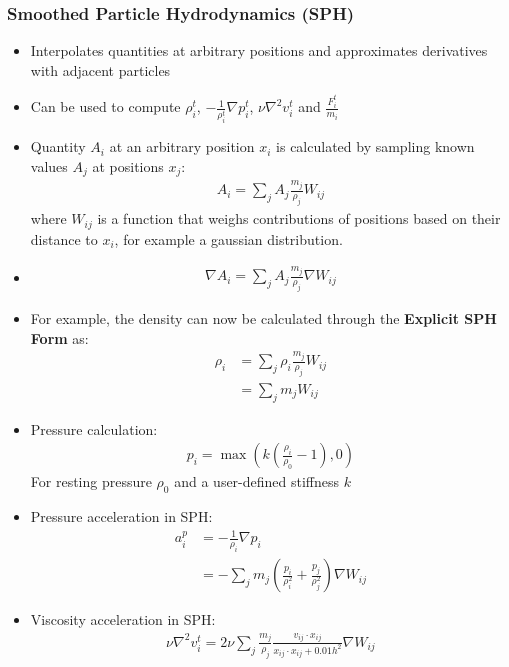 \documentclass{scrartcl}
\begin{document}
\subsubsection*{Smoothed Particle Hydrodynamics (SPH)}
\begin{itemize}
    \item Interpolates quantities at arbitrary positions and approximates derivatives with adjacent particles
    \item Can be used to compute $\rho_i^t$, $-\frac{1}{\rho_i^t}\nabla p_i^t$, $\nu\nabla^2 v_i^t$ and $\frac{F_i^t}{m_i}$
    \item Quantity $A_i$ at an arbitrary position $x_i$ is calculated by sampling known values $A_j$ at positions $x_j$:
    \begin{align*}
        A_i = \sum_j A_j \frac{m_j}{\rho_j}W_{ij}
    \end{align*}
    where $W_{ij}$ is a function that weighs contributions of positions based on their distance to $x_i$, for example a gaussian distribution.
    \item 
    \begin{align*}
        \nabla A_i = \sum_j A_j \frac{m_j}{\rho_j}\nabla W_{ij}
    \end{align*}
    \item For example, the density can now be calculated through the \textbf{Explicit SPH Form} as:
    \begin{align*}
        \rho_i &= \sum_j \rho_i \frac{m_j}{\rho_j}W_{ij}\\
        &= \sum_j m_jW_{ij}
    \end{align*}
    \item Pressure calculation:
    \begin{align*}
        p_i = \max\left(k\left(\frac{\rho_i}{\rho_0} -1\right), 0\right)
    \end{align*}
    For resting pressure $\rho_0$ and a user-defined stiffness $k$
    \item Pressure acceleration in SPH:
    \begin{align*}
       a_i^p &= -\frac{1}{\rho_i}\nabla p_i\\
       &= -\sum_j m_j \left(\frac{p_i}{\rho_i^2}+\frac{p_j}{\rho_j^2}\right)\nabla W_{ij}
    \end{align*}
    \item Viscosity acceleration in SPH:
    \begin{align*}
        \nu\nabla^2 v_i^t = 2\nu\sum_j \frac{m_j}{\rho_j} \frac{v_{ij} \cdot x_{ij}}{x_{ij} \cdot x_{ij} + 0.01h^2} \nabla W_{ij}
    \end{align*}
\end{itemize}
\end{document}
